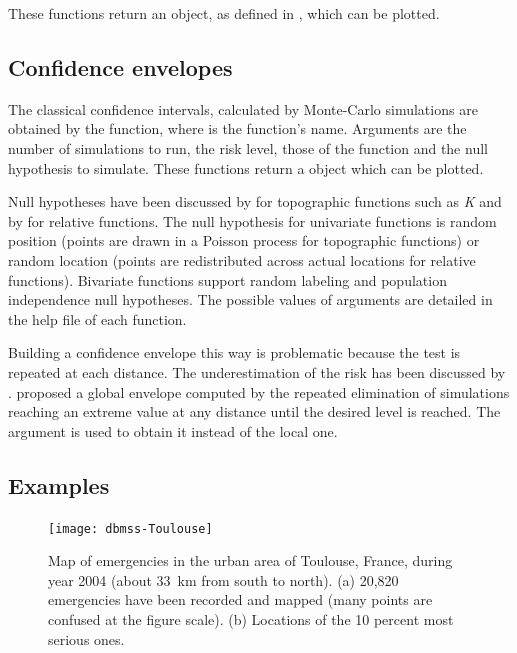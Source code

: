 \documentclass[nojss]{jss}
\begin{document}
These functions return an  object, as defined in , which can be plotted.

\subsection{Confidence envelopes}

The classical confidence intervals, calculated by Monte-Carlo simulations \citep{Kenkel1988} are obtained by the  function, where  is the function's name. Arguments are the number of simulations to run, the risk level, those of the function and the null hypothesis to simulate. These functions return a  object which can be plotted.

Null hypotheses have been discussed by \cite{Goreaud2003} for topographic functions such as \emph{K} and by \cite{Marcon2010} for relative functions. The null hypothesis for univariate functions is random position (points are drawn in a Poisson process for topographic functions) or random location (points are redistributed across actual locations for relative functions). Bivariate functions support random labeling and population independence null hypotheses. The possible values of arguments are detailed in the help file of each function.

Building a confidence envelope this way is problematic because the test is repeated at each distance. The underestimation of the risk has been discussed by \cite{Loosmore2006}. \cite{Duranton2005} proposed a global envelope computed by the repeated elimination of simulations reaching an extreme value at any distance until the desired level is reached. The argument  is used to obtain it instead of the local one.

\subsection{Examples}


\begin{figure}
\centering
\texttt{[image: dbmss-Toulouse]}
\caption{Map of emergencies in the urban area of Toulouse, France, during year 2004 (about 33~km from south to north). (a) 20,820 emergencies  have been recorded and mapped (many points are confused at the figure scale). (b) Locations of the 10 percent most serious ones.}
\label{Toulouse}
\end{figure}
\end{document}
